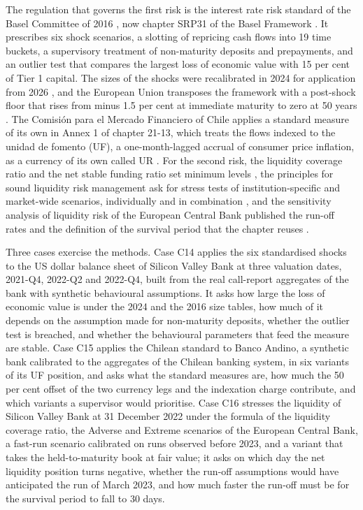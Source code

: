 The regulation that governs the first risk is the interest rate risk standard of the Basel Committee of 2016 \citep{alm:bcbs2016}, now chapter SRP31 of the Basel Framework \citep{alm:srp31}. It prescribes six shock scenarios, a slotting of repricing cash flows into 19 time buckets, a supervisory treatment of non-maturity deposits and prepayments, and an outlier test that compares the largest loss of economic value with 15 per cent of Tier 1 capital. The sizes of the shocks were recalibrated in 2024 for application from 2026 \citep{alm:bcbs2024}, and the European Union transposes the framework with a post-shock floor that rises from minus 1.5 per cent at immediate maturity to zero at 50 years \citep{alm:eu2024856}. The Comisi\'on para el Mercado Financiero of Chile applies a standard measure of its own in Annex 1 of chapter 21-13, which treats the flows indexed to the unidad de fomento (UF), a one-month-lagged accrual of consumer price inflation, as a currency of its own called UR \citep{alm:cmf2025,alm:bcchuf}. For the second risk, the liquidity coverage ratio and the net stable funding ratio set minimum levels \citep{alm:lcr,alm:nsf}, the principles for sound liquidity risk management ask for stress tests of institution-specific and market-wide scenarios, individually and in combination \citep{alm:bcbs2008}, and the sensitivity analysis of liquidity risk of the European Central Bank published the run-off rates and the definition of the survival period that the chapter reuses \citep{alm:ecb2019note,alm:ecb2019annex}.

Three cases exercise the methods. Case C14 applies the six standardised shocks to the US dollar balance sheet of Silicon Valley Bank at three valuation dates, 2021-Q4, 2022-Q2 and 2022-Q4, built from the real call-report aggregates of the bank with synthetic behavioural assumptions. It asks how large the loss of economic value is under the 2024 and the 2016 size tables, how much of it depends on the assumption made for non-maturity deposits, whether the outlier test is breached, and whether the behavioural parameters that feed the measure are stable. Case C15 applies the Chilean standard to Banco Andino, a synthetic bank calibrated to the aggregates of the Chilean banking system, in six variants of its UF position, and asks what the standard measures are, how much the 50 per cent offset of the two currency legs and the indexation charge contribute, and which variants a supervisor would prioritise. Case C16 stresses the liquidity of Silicon Valley Bank at 31 December 2022 under the formula of the liquidity coverage ratio, the Adverse and Extreme scenarios of the European Central Bank, a fast-run scenario calibrated on runs observed before 2023, and a variant that takes the held-to-maturity book at fair value; it asks on which day the net liquidity position turns negative, whether the run-off assumptions would have anticipated the run of March 2023, and how much faster the run-off must be for the survival period to fall to 30 days.

